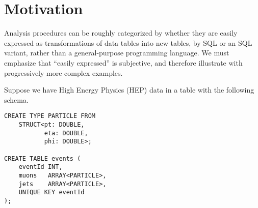 \documentclass[10pt, conference, compsocconf]{IEEEtran}
\begin{document}









%
%
%

\section{Motivation}

Analysis procedures can be roughly categorized by whether they are easily expressed as transformations of data tables into new tables, by SQL or an SQL variant, rather than a general-purpose programming language. We must emphasize that ``easily expressed'' is subjective, and therefore illustrate with progressively more complex examples.

Suppose we have High Energy Physics (HEP) data in a table with the following schema.

\vspace{0.15 cm}
\begin{verbatim}
CREATE TYPE PARTICLE FROM
    STRUCT<pt: DOUBLE,
           eta: DOUBLE,
           phi: DOUBLE>;

CREATE TABLE events (
    eventId INT,
    muons   ARRAY<PARTICLE>,
    jets    ARRAY<PARTICLE>,
    UNIQUE KEY eventId
);
\end{verbatim}
\end{document}
